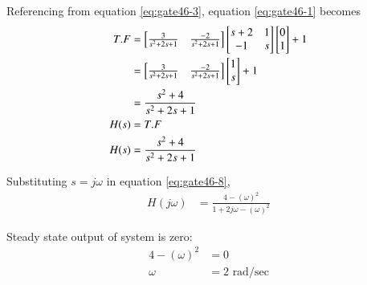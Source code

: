 \documentclass[a4,12pt,onecolumn]{IEEEtran}
\begin{document}
Referencing from equation \eqref{eq:gate46-3}, equation \eqref{eq:gate46-1} becomes 
\begin{align}
T.F &= \begin{bmatrix} \frac{3}{s^2+2s+1} & \frac{-2}{s^2+2s+1} \end{bmatrix} \begin{bmatrix}s+2 & 1 \\ -1 & s\end{bmatrix} \begin{bmatrix}0 \\ 1\end{bmatrix} + 1 \\
&= \begin{bmatrix} \frac{3}{s^2+2s+1} & \frac{-2}{s^2+2s+1} \end{bmatrix}  \begin{bmatrix}1 \\ s\end{bmatrix} + 1 \\
&= \frac{s^2 + 4}{s^2 + 2s + 1} \\
H(s) &= T.F \\
H(s) &= \frac{s^2 + 4}{s^2+2s+1} \label{eq:gate46-8}
\end{align}

Substituting $s=j\omega$ in equation \eqref{eq:gate46-8},
\begin{align}
H(j\omega) &= \frac{4-(\omega)^2}{1+2j\omega-(\omega)^2}
\end{align}

Steady state output of system is zero:
\begin{align}
4-(\omega)^2 &= 0 \\
\omega &= 2 \text{ rad/sec}
\end{align}
\end{document}
